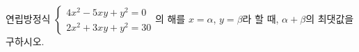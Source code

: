 연립방정식 $\begin{cases} 4x^2-5xy+y^2=0 \\ 2x^2+3xy+y^2=30 \end{cases}$의 해를 $x=\alpha$, $y=\beta$라 할 때, $\alpha+\beta$의 최댓값을 구하시오.
